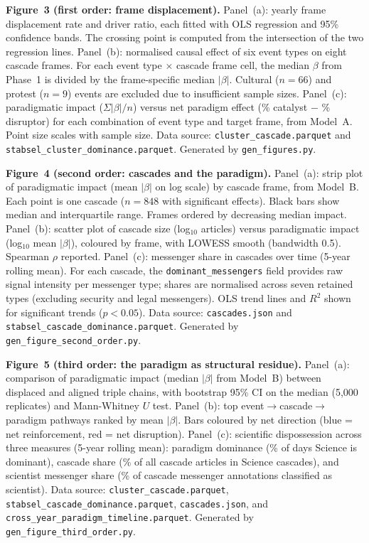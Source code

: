 \textbf{Figure~3 (first order: frame displacement).} Panel~(a): yearly frame displacement rate and driver ratio, each fitted with OLS regression and 95\% confidence bands. The crossing point is computed from the intersection of the two regression lines. Panel~(b): normalised causal effect of six event types on eight cascade frames. For each event type $\times$ cascade frame cell, the median $\beta$ from Phase~1 is divided by the frame-specific median $|\beta|$. Cultural ($n = 66$) and protest ($n = 9$) events are excluded due to insufficient sample sizes. Panel~(c): paradigmatic impact ($\Sigma|\beta|/n$) versus net paradigm effect (\% catalyst $-$ \% disruptor) for each combination of event type and target frame, from Model~A. Point size scales with sample size. Data source: \texttt{cluster\_cascade.parquet} and \texttt{stabsel\_cluster\_dominance.parquet}. Generated by \texttt{gen\_figures.py}.

\textbf{Figure~4 (second order: cascades and the paradigm).} Panel~(a): strip plot of paradigmatic impact (mean $|\beta|$ on log scale) by cascade frame, from Model~B. Each point is one cascade ($n = 848$ with significant effects). Black bars show median and interquartile range. Frames ordered by decreasing median impact. Panel~(b): scatter plot of cascade size (log$_{10}$ articles) versus paradigmatic impact (log$_{10}$ mean $|\beta|$), coloured by frame, with LOWESS smooth (bandwidth 0.5). Spearman $\rho$ reported. Panel~(c): messenger share in cascades over time (5-year rolling mean). For each cascade, the \texttt{dominant\_messengers} field provides raw signal intensity per messenger type; shares are normalised across seven retained types (excluding security and legal messengers). OLS trend lines and $R^2$ shown for significant trends ($p < 0.05$). Data source: \texttt{cascades.json} and \texttt{stabsel\_cascade\_dominance.parquet}. Generated by \texttt{gen\_figure\_second\_order.py}.

\textbf{Figure~5 (third order: the paradigm as structural residue).} Panel~(a): comparison of paradigmatic impact (median $|\beta|$ from Model~B) between displaced and aligned triple chains, with bootstrap 95\% CI on the median (5,000 replicates) and Mann-Whitney $U$ test. Panel~(b): top event$\to$cascade$\to$paradigm pathways ranked by mean $|\beta|$. Bars coloured by net direction (blue = net reinforcement, red = net disruption). Panel~(c): scientific dispossession across three measures (5-year rolling mean): paradigm dominance (\% of days Science is dominant), cascade share (\% of all cascade articles in Science cascades), and scientist messenger share (\% of cascade messenger annotations classified as scientist). Data source: \texttt{cluster\_cascade.parquet}, \texttt{stabsel\_cascade\_dominance.parquet}, \texttt{cascades.json}, and \texttt{cross\_year\_paradigm\_timeline.parquet}. Generated by \texttt{gen\_figure\_third\_order.py}.

